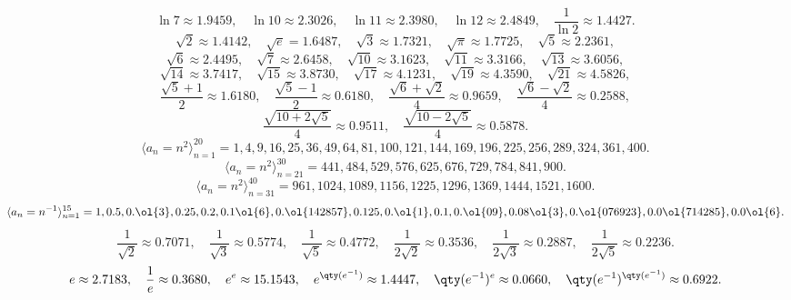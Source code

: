 \documentclass[a4paper,12pt]{article}
\begin{document}
\[\ln 7\approx 1.9459,\quad\ln 10\approx 2.3026,\quad\ln 11\approx 2.3980,\quad\ln 12\approx 2.4849,\quad\frac{1}{\ln 2}\approx 1.4427.\]
\[\sqrt{2}\approx 1.4142,\quad\sqrt{e}=1.6487,\quad\sqrt{3}\approx 1.7321,\quad\sqrt{\pi}\approx 1.7725,\quad\sqrt{5}\approx 2.2361,\]
\[\sqrt{6}\approx 2.4495,\quad\sqrt{7}\approx 2.6458,\quad\sqrt{10}\approx 3.1623,\quad\sqrt{11}\approx 3.3166,\quad\sqrt{13}\approx 3.6056,\]
\[\sqrt{14}\approx 3.7417,\quad\sqrt{15}\approx 3.8730,\quad\sqrt{17}\approx 4.1231,\quad\sqrt{19}\approx 4.3590,\quad\sqrt{21}\approx 4.5826,\]
\[\frac{\sqrt{5}+1}{2}\approx 1.6180,\quad\frac{\sqrt{5}-1}{2}\approx 0.6180,\quad\frac{\sqrt{6}+\sqrt{2}}{4}\approx 0.9659,\quad\frac{\sqrt{6}-\sqrt{2}}{4}\approx 0.2588,\]
\[\frac{\sqrt{10+2\sqrt{5}}}{4}\approx 0.9511,\quad\frac{\sqrt{10-2\sqrt{5}}}{4}\approx 0.5878.\]
\[\langle a_n=n^2\rangle_{n=1}^{20}=1,4,9,16,25,36,49,64,81,100,121,144,169,196,225,256,289,324,361,400.\]
\[\langle a_n=n^2\rangle_{n=21}^{30}=441,484,529,576,625,676,729,784,841,900.\]
\[\langle a_n=n^2\rangle_{n=31}^{40}=961,1024,1089,1156,1225,1296,1369,1444,1521,1600.\]
\[\langle a_n=n^{-1}\rangle_{n=1}^{15}=1,0.5,0.\ol{3},0.25,0.2,0.1\ol{6},0.\ol{142857},0.125,0.\ol{1},0.1,0.\ol{09},0.08\ol{3},0.\ol{076923},0.0\ol{714285},0.0\ol{6}.\]
\[\frac{1}{\sqrt{2}}\approx 0.7071,\quad\frac{1}{\sqrt{3}}\approx 0.5774,\quad\frac{1}{\sqrt{5}}\approx 0.4772,\quad\frac{1}{2\sqrt{2}}\approx 0.3536,\quad\frac{1}{2\sqrt{3}}\approx 0.2887,\quad\frac{1}{2\sqrt{5}}\approx 0.2236.\]
\[e\approx 2.7183,\quad\frac{1}{e}\approx 0.3680,\quad e^e\approx 15.1543,\quad e^{\qty(e^{-1})}\approx 1.4447,\quad \qty(e^{-1})^e\approx 0.0660,\quad\qty(e^{-1})^{\qty(e^{-1})}\approx 0.6922.\]
\end{document}
